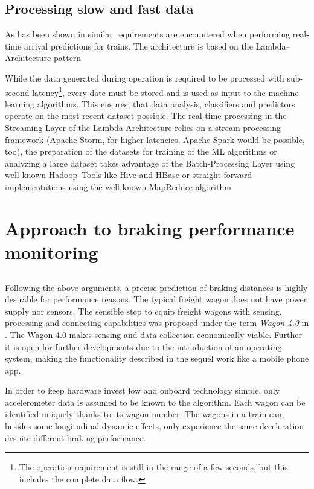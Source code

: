 \documentclass[a4paper, 12pt]{scrartcl}
\begin{document}
\subsection{Processing slow and fast data}
As has been shown in \cite{elsen:M318} similar requirements are encountered when performing real-time arrival predictions for trains. The architecture is based on the Lambda--Architecture pattern \cite{Marz2015}

While the data generated during operation is required to be processed with sub-second latency\footnote{The operation requirement is still in the range of a few seconds, but this includes the complete data flow.}, every date must be stored and is used as input to the machine learning algorithms. This ensures, that data analysis, classifiers and predictors operate on the most recent dataset possible. The real-time processing in the Streaming Layer of the Lambda-Architecture relies on a stream-processing framework (Apache Storm, for higher latencies, Apache Spark would be possible, too), the preparation of the datasets for training of the ML algorithms or analyzing a large dataset takes advantage of the Batch-Processing Layer using well known Hadoop--Tools like Hive and HBase or straight forward implementations using the well known MapReduce algorithm \cite{Dean:2004:MSD:1251254.1251264}

\section{Approach to braking performance monitoring}
\subsection{}
Following the above arguments, a precise prediction of braking distances is highly desirable for performance reasons. The typical freight wagon does not have power supply nor sensors. The sensible step to equip freight wagons with sensing, processing and connecting capabilities was proposed under the term \textit{Wagon 4.0} in \cite{pfaff2017stephenson}. The Wagon 4.0 makes sensing and data collection economically viable. Further it is open for further developments due to the introduction of an operating system, making the functionality described in the sequel work like a mobile phone app.

In order to keep hardware invest low and onboard technology simple, only accelerometer data is assumed to be known to the algorithm. Each wagon can be identified uniquely thanks to its wagon number. The wagons in a train can, besides some longitudinal dynamic effects, only experience the same deceleration despite different braking performance.
\end{document}
